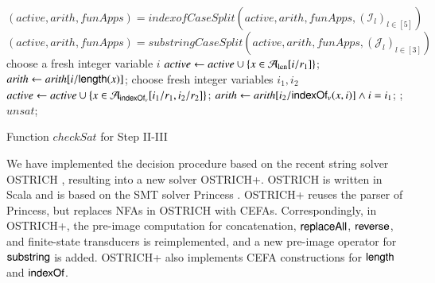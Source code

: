 
\begin{algorithm}[tbp]
	\small
	{
		$(\mathit{active}, \mathit{arith}, \mathit{funApps}) = \mathit{indexofCaseSplit}(\mathit{active}, \mathit{arith}, \mathit{funApps}, (\mathcal{I}_l)_{l \in [5]})$\; 
		$(\mathit{active}, \mathit{arith}, \mathit{funApps})= \mathit{substringCaseSplit}(\mathit{active}, \mathit{arith}, \mathit{funApps}, (\mathcal{J}_l)_{l \in [3]})$\; 
		{
			choose a fresh integer variable $i$\;
			$\mathit{active} \leftarrow \mathit{active} \cup \{x \in \mathcal{A}_{\rm len}[i/r_1]\}$; $\mathit{arith}\leftarrow \mathit{arith}[i/\mathsf{length}(x)]$;
		}
		{
			choose fresh integer variables $i_1,i_2$\;
			$\mathit{active} \leftarrow \mathit{active} \cup \{x \in \mathcal{A}_{\mathsf{indexOf}_v}[i_1/r_1,i_2/r_2]\}$; $\mathit{arith}\leftarrow \mathit{arith}[i_2/\mathsf{indexOf}_v(x,i)] \wedge i=i_1$;
		}
		{
			;}
	}
	\Return $\mathit{unsat}$; 		
	\caption{Function $\mathit{checkSat}$
		for Step II-III} \label{alg:checksat} 
\end{algorithm}

We have implemented the decision procedure based on the recent string solver OSTRICH \cite{CHL+19}, resulting into a new solver OSTRICH+. OSTRICH is  written in Scala and is based on the SMT solver Princess \cite{princess08}. 
OSTRICH+ reuses the parser of Princess, but replaces NFAs in OSTRICH with CEFAs. Correspondingly, in OSTRICH+, the pre-image  computation for concatenation, $\mathsf{replaceAll}$, $\mathsf{reverse}$, and finite-state transducers is reimplemented, and a new pre-image operator for $\mathsf{substring}$ is added. OSTRICH+ also implements CEFA constructions for $\mathsf{length}$ and $\mathsf{indexOf}$.  

